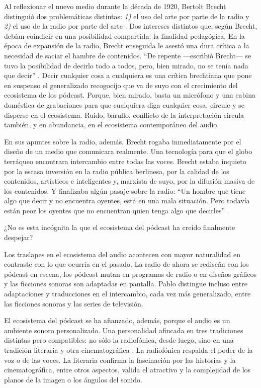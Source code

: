 \documentclass[
  spanish,
  11pt,
  a4paper,
]{scrbook}
\begin{document}
Al reflexionar el nuevo medio durante la década de 1920, Bertolt Brecht
distinguió dos problemáticas distintas: \emph{1)} el uso del arte por
parte de la radio y \emph{2)} el uso de la radio por parte del arte
\autocite[8]{Brecht2003}. Dos intereses distintos que, según Brecht,
debían coindicir en una posibilidad compartida: la finalidad pedagógica.
En la época de expansión de la radio, Brecht enseguida le asestó una
dura crítica a la necesidad de saciar el hambre de contenidos. ``De
repente ---escribió Brecht--- se tuvo la posibilidad de decirlo todo a
todos, pero, bien mirado, no se tenía nada que decir''
\autocite[12]{Brecht2003}. Decir cualquier cosa a cualquiera es una
crítica brechtiana que pone en suspenso el generalizado recogocijo que
va de suyo con el crecimiento del ecosistema de los pódcast. Porque,
bien mirado, basta un micrófono y una cabina doméstica de grabaciones
para que cualquiera diga cualquier cosa, circule y se disperse en el
ecosistema. Ruido, barullo, conflicto de la interpretación circula
también, y en abundancia, en el ecosistema contemporáneo del audio.

En sus apuntes sobre la radio, además, Brecht rogaba inmediatamente por
el diseño de un medio que comunicara realmente. Una tecnología para que
el globo terráqueo encontrara intercambio entre todas las voces. Brecht
estaba inquieto por la escasa inversión en la radio pública berlinesa,
por la calidad de los contenidos, artísticos e inteligentes y, marxista
de suyo, por la difusión masiva de los contenidos. Y finalizaba algún
pasaje sobre la radio: ``Un hombre que tiene algo que decir y no
encuentra oyentes, está en una mala situación. Pero todavía están peor
los oyentes que no encuentran quien tenga algo que decirles''
\autocite[6]{Brecht2003}.

¿No es esta incógnita la que el ecosistema del pódcast ha creído
finalmente despejar?

Los traslapes en el ecosistema del audio acontecen con mayor naturalidad
en contraste con lo que ocurría en el pasado. La radio de ahora se
rediseña con los pódcast en escena, los pódcast mutan en programas de
radio o en diseños gráficos y las ficciones sonoras son adaptadas en
pantalla. Pablo \textcite{Fischer2021} distingue incluso entre
adaptaciones y traducciones en el intercambio, cada vez más
generalizado, entre las ficciones sonoras y las series de televisión.

El ecosistema del pódcast se ha afianzado, además, porque el audio es un
ambiente sonoro personalizado. Una personalidad afincada en tres
tradiciones distintas pero compatibles: no sólo la radiofónica, desde
luego, sino en una tradición literaria y otra cinematográfica
\autocite{EspinosadelosMonteros2020}. La radiofónica respalda el poder
de la voz o de las voces. La literaria confirma la fascinación por las
historias y la cinematográfica, entre otros aspectos, valida el
atractivo y la complejidad de los planos de la imagen o los ángulos del
sonido.
\end{document}
